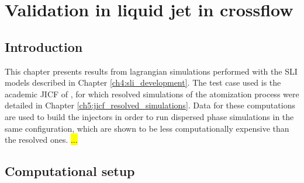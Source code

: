 \chapter{Validation in liquid jet in crossflow}
	\label{ch6:jicf_lgs_simulations}


%
%
%	
%	
%	
%	
%


\section{Introduction}

This chapter presents results from lagrangian simulations performed with the SLI models described in Chapter \ref{ch4:sli_development}. The test case used is the academic JICF of , for which resolved simulations of the atomization process were detailed in Chapter \ref{ch5:jicf_resolved_simulations}. Data for these computations are used to build the injectors in order to run dispersed phase simulations in the same configuration, which are shown to be less computationally expensive than the resolved ones. \hl{...}


\section{Computational setup}

